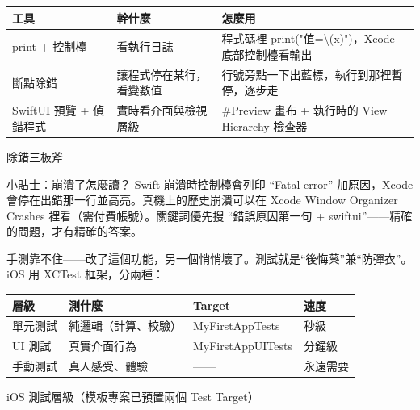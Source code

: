 


\begin{center}
\begin{tabularx}{\linewidth}{|X|X|X|}
\hline
\textbf{工具} & \textbf{幹什麼} & \textbf{怎麼用} \tabularnewline
\hline
print + 控制檯 & 看執行日誌 & 程式碼裡 print("值=\textbackslash{}(x)")，Xcode 底部控制檯看輸出 \tabularnewline
斷點除錯 & 讓程式停在某行，看變數值 & 行號旁點一下出藍標，執行到那裡暫停，逐步走 \tabularnewline
SwiftUI 預覽 + 偵錯程式 & 實時看介面與檢視層級 & \#Preview 畫布 + 執行時的 View Hierarchy 檢查器 \tabularnewline
\hline
\end{tabularx}
\end{center}

\begin{center}\small\color{gray}除錯三板斧\end{center}

\begin{tcbinfo}{小貼士：崩潰了怎麼讀？}
Swift 崩潰時控制檯會列印 “Fatal error” 加原因，Xcode 會停在出錯那一行並高亮。真機上的歷史崩潰可以在 Xcode Window Organizer Crashes 裡看（需付費帳號）。關鍵詞優先搜 “錯誤原因第一句 + swiftui”——精確的問題，才有精確的答案。

\end{tcbinfo}


手測靠不住——改了這個功能，另一個悄悄壞了。測試就是“後悔藥”兼“防彈衣”。iOS 用 XCTest 框架，分兩種：

\begin{center}
\begin{tabularx}{\linewidth}{|X|X|X|X|}
\hline
\textbf{層級} & \textbf{測什麼} & \textbf{Target} & \textbf{速度} \tabularnewline
\hline
單元測試 & 純邏輯（計算、校驗） & MyFirstAppTests & 秒級 \tabularnewline
UI 測試 & 真實介面行為 & MyFirstAppUITests & 分鐘級 \tabularnewline
手動測試 & 真人感受、體驗 & —— & 永遠需要 \tabularnewline
\hline
\end{tabularx}
\end{center}

\begin{center}\small\color{gray}iOS 測試層級（模板專案已預置兩個 Test Target）\end{center}

